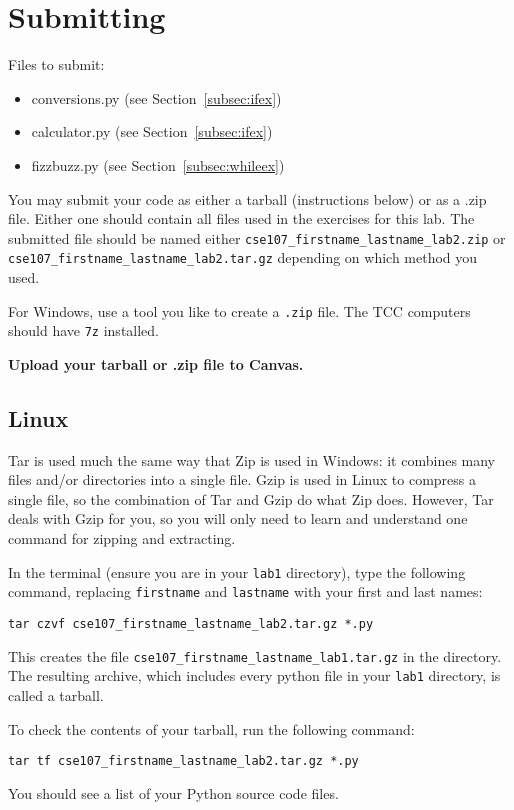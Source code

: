 \documentclass[11pt,hidelinks]{article}
\begin{document}
\pagebreak

\section{Submitting}

Files to submit:
\begin{itemize}
  \item conversions.py (see Section~\ref{subsec:ifex})
  \item calculator.py (see Section~\ref{subsec:ifex})
  \item fizzbuzz.py (see Section~\ref{subsec:whileex})
\end{itemize}

You may submit your code as either a tarball (instructions below) or as a .zip
file. Either one should contain all files used in the exercises for this lab.
The submitted file should be named either
\texttt{cse107\_firstname\_lastname\_lab2.zip} or
\texttt{cse107\_firstname\_lastname\_lab2.tar.gz} depending on which method you
used.

For Windows, use a tool you like to create a \texttt{.zip} file. The TCC computers should
have \texttt{7z} installed.

\begin{center}
  \textbf{Upload your tarball or .zip file to Canvas.}
\end{center}

\subsection{Linux}

Tar is used much the same way that Zip is used in Windows: it combines many files and/or directories into a single file. Gzip is used in Linux to compress a single file, so the combination of Tar and Gzip do what Zip does. However, Tar deals with Gzip for you, so you will only need to learn and understand one command for zipping and extracting.

In the terminal (ensure you are in your \texttt{lab1} directory), type the following command, replacing \texttt{firstname} and \texttt{lastname} with your first and last names:

\begin{lstlisting}[style=bash]
tar czvf cse107_firstname_lastname_lab2.tar.gz *.py
\end{lstlisting}

This creates the file \texttt{cse107\_firstname\_lastname\_lab1.tar.gz} in the directory. The resulting archive, which includes every python file in your \texttt{lab1} directory, is called a tarball. 

To check the contents of your tarball, run the following command:

\begin{lstlisting}[style=bash]
tar tf cse107_firstname_lastname_lab2.tar.gz *.py
\end{lstlisting}

You should see a list of your Python source code files.
\end{document}
